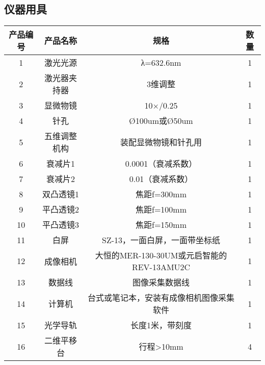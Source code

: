 \documentclass[dvipsnames, svgnames,a4paper,11pt]{article}
\begin{document}
	\subsection{仪器用具}
	\begin{table}[htbp]
		\centering
		\begin{tabular}{|c|c|c|c|}
			\hline
			
			\textbf{产品编号} & \textbf{产品名称} & \textbf{规格}          & \textbf{数量} \\ \hline
			1                & 激光光源           & λ=632.6nm            & 1            \\ \hline
			2                & 激光器夹持器       & 3维调整               & 1            \\ \hline
			3                & 显微物镜           & 10×/0.25             & 1            \\ \hline
			4                & 针孔               & Ø100um或Ø50um       & 1            \\ \hline
			5                & 五维调整机构       & 装配显微物镜和针孔用 & 1            \\ \hline
			6                & 衰减片1            & 0.0001（衰减系数）  & 1            \\ \hline
			7                & 衰减片2            & 0.01（衰减系数）     & 1            \\ \hline
			8                & 双凸透镜1          & 焦距f=300mm         & 1            \\ \hline
			9                & 平凸透镜2          & 焦距f=100mm         & 1            \\ \hline
			10               & 平凸透镜3          & 焦距f=150mm         & 1            \\ \hline
			11               & 白屏               & SZ-13，一面白屏，一面带坐标纸 & 1 \\ \hline
			12               & 成像相机           & 大恒的MER-130-30UM或元启智能的REV-13AMU2C & 1 \\ \hline
			13               & 数据线             & 图像采集数据线       & 1            \\ \hline
			14               & 计算机             & 台式或笔记本，安装有成像相机图像采集软件 & 1 \\ \hline
			15               & 光学导轨           & 长度1米，带刻度      & 1            \\ \hline
			16               & 二维平移台         & 行程>10mm            & 4            \\ \hline

\end{tabular}
\end{table}
\end{document}
